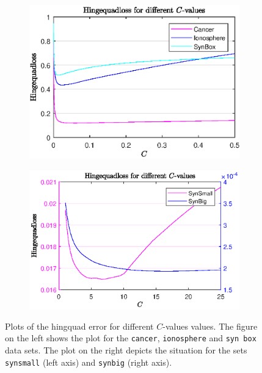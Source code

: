 \begin{figure}[ht]
	\begin{subfigure}{0.46\textwidth}
		\includegraphics[width=\textwidth]{Pictures/Plots/CanIonBox_fin.eps}%
	\end{subfigure}
	\begin{subfigure}{0.52\textwidth}
		\includegraphics[width=\textwidth]{Pictures/Plots/SysSyb_fin.eps}%
	\end{subfigure}
	\caption[Objective function values]{Plots of the hingquad error for different $C$-values values. The figure on the left shows the plot for the \textup{\texttt{cancer}}, \textup{\texttt{ionosphere}} and \textup{\texttt{syn box}} data sets. The plot on the right depicts the situation for the sets \textup{\texttt{synsmall}} (left axis) and \textup{\texttt{synbig}} (right axis).}%
	\label{fig_C_vs_err}%
\end{figure}

